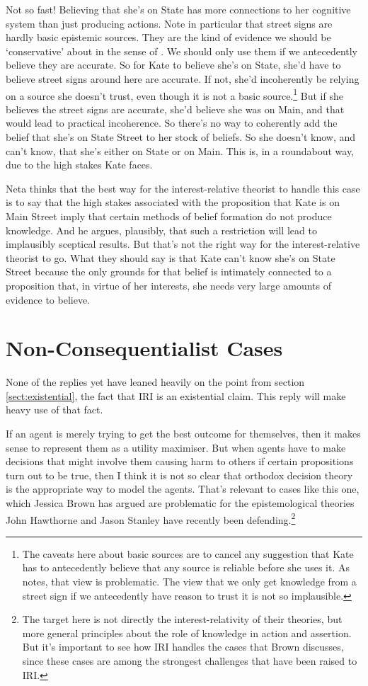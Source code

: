 \documentclass[oneside]{book}
\begin{document}
Not so fast! Believing that she's on State has more connections to her cognitive system than just producing actions. Note in particular that street signs are hardly basic epistemic sources. They are the kind of evidence we should be `conservative' about in the sense of \cite{Pryor2004-PRYWWW}. We should only use them if we antecedently believe they are accurate. So for Kate to believe she's on State, she'd have to believe street signs around here are accurate. If not, she'd incoherently be relying on a source she doesn't trust, even though it is not a basic source.\footnote{The caveats here about basic sources are to cancel any suggestion that Kate has to antecedently believe that any source is reliable before she uses it. As \cite{Pryor2000-PRYTSA} notes, that view is problematic. The view that we only get knowledge from a street sign if we antecedently have reason to trust it is not so implausible.} But if she believes the street signs are accurate, she'd believe she was on Main, and that would lead to practical incoherence. So there's no way to coherently add the belief that she's on State Street to her stock of beliefs. So she doesn't know, and can't know, that she's either on State or on Main. This is, in a roundabout way, due to the high stakes Kate faces.

Neta thinks that the best way for the interest-relative theorist to handle this case is to say that the high stakes associated with the proposition that Kate is on Main Street imply that certain methods of belief formation do not produce knowledge. And he argues, plausibly, that such a restriction will lead to implausibly sceptical results. But that's not the right way for the interest-relative theorist to go. What they should say is that Kate can't know she's on State Street because the only grounds for that belief is intimately connected to a proposition that, in virtue of her interests, she needs very large amounts of evidence to believe.

\section{Non-Consequentialist Cases}
None of the replies yet have leaned heavily on the point from section \ref{sect:existential}, the fact that IRI is an existential claim. This reply will make heavy use of that fact.

If an agent is merely trying to get the best outcome for themselves, then it makes sense to represent them as a utility maximiser. But when agents have to make decisions that might involve them causing harm to others if certain propositions turn out to be true, then I think it is not so clear that orthodox decision theory is the appropriate way to model the agents. That's relevant to cases like this one, which Jessica Brown has argued are problematic for the epistemological theories John Hawthorne and Jason Stanley have recently been defending.\footnote{The target here is not directly the interest-relativity of their theories, but more general principles about the role of knowledge in action and assertion. But it's important to see how IRI handles the cases that Brown discusses, since these cases are among the strongest challenges that have been raised to IRI.}
\end{document}
